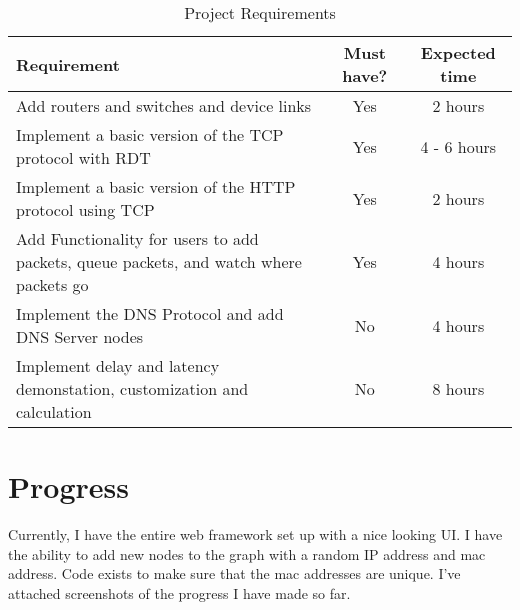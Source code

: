 \documentclass{assignment-x}
\begin{document}
\begin{table}[h]
    \centering
    \caption{Project Requirements}
    \label{tab:example}
    \begin{tabular}{|p{7cm}  c   c |} 
     \hline
     Requirement & Must have? & Expected time \\ [0.5ex] 
     \hline\hline
     Add routers and switches and device links & Yes & 2 hours \\
     \hline
     Implement a basic version of the TCP protocol with RDT & Yes &4 - 6 hours \\
     \hline
     Implement a basic version of the HTTP protocol using TCP & Yes  & 2 hours \\
     \hline
     Add Functionality for users to add packets, queue packets, and watch where packets go & Yes & 4 hours \\
     \hline
     Implement the DNS Protocol and add DNS Server nodes & No & 4 hours \\
     \hline
     Implement delay and latency demonstation, customization and calculation & No & 8 hours \\
     \hline
    \end{tabular}
\end{table}

\section{Progress}
Currently, I have the entire web framework set up with a nice looking UI. I have the ability to add new nodes to the graph with a random IP address and mac address. Code exists to make sure that the mac addresses are unique. I've attached screenshots of the progress I have made so far.
\end{document}
